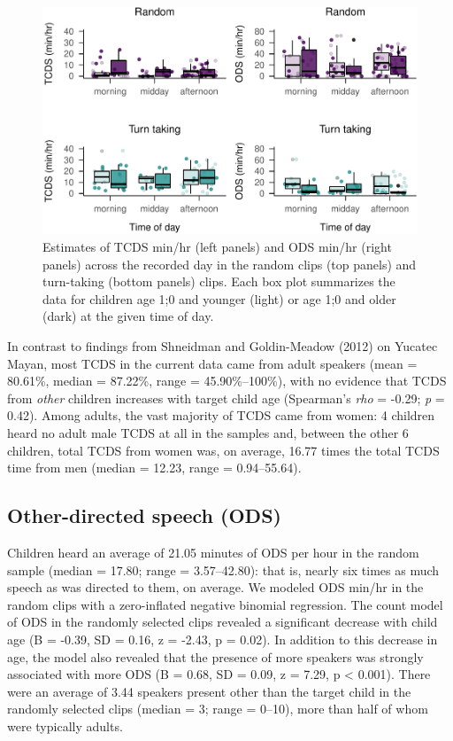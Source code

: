 \documentclass[,man,floatsintext]{apa6}
\begin{document}
\begin{figure}
\centering
\includegraphics{Tseltal-CLE_files/figure-latex/fig5-1.pdf}
\caption{\label{fig:fig5}Estimates of TCDS min/hr (left panels) and ODS
min/hr (right panels) across the recorded day in the random clips (top
panels) and turn-taking (bottom panels) clips. Each box plot summarizes
the data for children age 1;0 and younger (light) or age 1;0 and older
(dark) at the given time of day.}
\end{figure}

In contrast to findings from Shneidman and Goldin-Meadow (2012) on
Yucatec Mayan, most TCDS in the current data came from adult speakers
(mean = 80.61\%, median = 87.22\%, range = 45.90\%--100\%), with no
evidence that TCDS from \emph{other} children increases with target
child age (Spearman's \emph{rho} = -0.29; \emph{p} = 0.42). Among
adults, the vast majority of TCDS came from women: 4 children heard no
adult male TCDS at all in the samples and, between the other 6 children,
total TCDS from women was, on average, 16.77 times the total TCDS time
from men (median = 12.23, range = 0.94--55.64).

\subsection{Other-directed speech
(ODS)}\label{other-directed-speech-ods}

Children heard an average of 21.05 minutes of ODS per hour in the random
sample (median = 17.80; range = 3.57--42.80): that is, nearly six times
as much speech as was directed to them, on average. We modeled ODS
min/hr in the random clips with a zero-inflated negative binomial
regression. The count model of ODS in the randomly selected clips
revealed a significant decrease with child age (B = -0.39, SD = 0.16, z
= -2.43, p = 0.02). In addition to this decrease in age, the model also
revealed that the presence of more speakers was strongly associated with
more ODS (B = 0.68, SD = 0.09, z = 7.29, p \textless{} 0.001). There
were an average of 3.44 speakers present other than the target child in
the randomly selected clips (median = 3; range = 0--10), more than half
of whom were typically adults.
\end{document}
